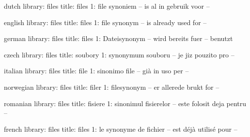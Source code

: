 

\unprotect

%

\startmessages  dutch  library: files
   title: files
       1: file synoniem -- is al in gebruik voor --
\stopmessages

\startmessages  english  library: files
   title: files
       1: file synonym -- is already used for --
\stopmessages

\startmessages  german  library: files
   title: files
       1: Dateisynonym -- wird bereits fuer -- benutzt
\stopmessages

\startmessages  czech  library: files
   title: soubory
       1: synonymum souboru -- je jiz pouzito pro --
\stopmessages

\startmessages  italian  library: files
   title: file
       1: sinonimo file -- già in uso per --
\stopmessages

\startmessages  norwegian  library: files
   title: filer
       1: filesynonym -- er allerede brukt for --
\stopmessages

\startmessages  romanian  library: files
   title: fisiere
       1: sinonimul fisierelor -- este folosit deja pentru --
\stopmessages

\startmessages  french  library: files
   title: files
       1: le synonyme de fichier -- est déjà utilisé pour --
\stopmessages


\let\usedtempfile\gobbleonearguments

\def\registertempfile#1{\immediatewriteutilitycommand{\usedtempfile{#1}}}


